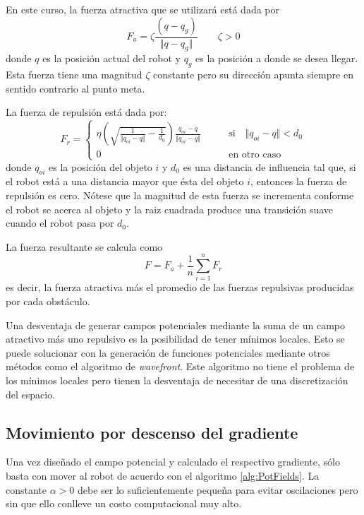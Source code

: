 \documentclass[a4paper]{article}
\newcommand\ddfrac[2]{\frac{\displaystyle #1}{\displaystyle #2}}
\begin{document}
En este curso, la fuerza atractiva que se utilizará está dada por
\begin{equation}
  \label{eq:attractive}
  F_a = \zeta \ddfrac{\left(q - q_g\right) }{\Vert q - q_g \Vert}\qquad \zeta > 0
\end{equation}
donde $q$ es la posición actual del robot y $q_g$ es la posición a donde se desea llegar. Esta fuerza tiene una magnitud $\zeta$ constante pero su dirección apunta siempre en sentido contrario al punto meta. 

La fuerza de repulsión está dada por:
\begin{equation}
  \label{eq:repulsive}
  F_r = \begin{cases}
    \eta\left(\sqrt{\frac{1}{\Vert q_{oi} - q\Vert} - \frac{1}{d_0}}\right)\ddfrac{q_{oi} - q}{\Vert q_{oi} - q\Vert}
    & \qquad\textrm{si}\quad \Vert q_{oi} - q\Vert < d_0\\
    0 & \qquad\textrm{en otro caso}
  \end{cases}
\end{equation}
donde $q_{oi}$ es la posición del objeto $i$ y $d_0$ es una distancia de influencia tal que, si el robot está a una distancia mayor que ésta del objeto $i$, entonces la fuerza de repulsión es cero. Nótese que la magnitud de esta fuerza se incrementa conforme el robot se acerca al objeto y la raiz cuadrada produce una transición suave cuando el robot pasa por $d_0$.

La fuerza resultante se calcula como 
\begin{equation}
  \label{eq:resulting}
  F = F_a + \frac{1}{n}\sum_{i=1}^n F_r
\end{equation}
es decir, la fuerza atractiva más el promedio de las fuerzas repulsivas producidas por cada obstáculo.

Una desventaja de generar campos potenciales mediante la suma de un campo atractivo más uno repulsivo es la posibilidad de tener mínimos locales. Esto se puede solucionar con la generación de funciones potenciales mediante otros métodos como el algoritmo de \textit{wavefront}. Este algoritmo no tiene el problema de los mínimos locales pero tienen la desventaja de necesitar de una discretización del espacio.

\subsection{Movimiento por descenso del gradiente}
Una vez diseñado el campo potencial y calculado el respectivo gradiente, sólo basta con mover al robot de acuerdo con el algoritmo \ref{alg:PotFields}. La constante $\alpha > 0$ debe ser lo suficientemente pequeña para evitar oscilaciones pero sin que ello conlleve un costo computacional muy alto. 
\end{document}
